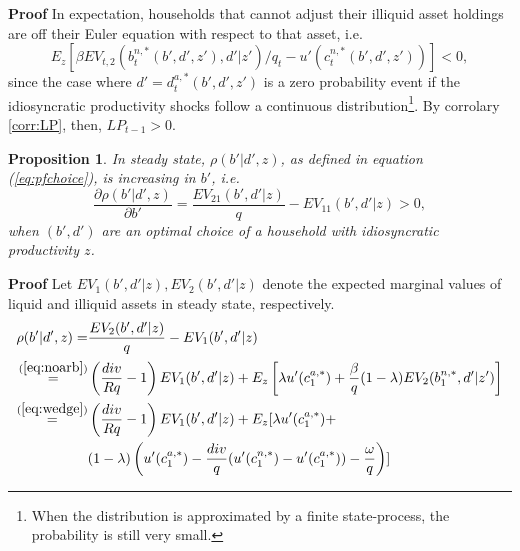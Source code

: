 \documentclass[11pt]{article} %
\newtheorem{prop}{Proposition}
\begin{document}
\textbf{Proof} In expectation, households that cannot adjust their illiquid asset holdings are off their Euler equation with respect to that asset, i.e.
\begin{equation}
E_z \left[ \beta EV_{t,2}(b_t^{n,*}(b',d',z'),d'|z')/q_t - u'(c^{n,*}_t(b',d',z')) \right] <0,
\end{equation}
since the case where $d' = d_t^{a,*}(b',d',z')$ is a zero probability event if the idiosyncratic productivity shocks follow a continuous distribution\footnote{When the distribution is approximated by a finite state-process, the probability is still very small.}. By corrolary \ref{corr:LP}, then, $LP_{t-1}>0$.


\begin{prop}\label{prop:rho}
In steady state, $\rho(b'|d',z)$, as defined in equation (\ref{eq:pfchoice}), is increasing in $b'$, i.e.
\begin{equation}
\frac{\partial \rho(b'|d',z)}{\partial b'} = \frac{EV_{21}(b',d'|z)}{q} - EV_{11}(b',d'|z) > 0,
\end{equation}
when $(b',d')$ are an optimal choice of a household with idiosyncratic productivity $z$.
\end{prop}
\textbf{Proof} Let $EV_1(b',d'|z),EV_2(b',d'|z)$ denote the expected marginal values of liquid and illiquid assets in steady state, respectively.
\begin{align}
\rho(b'|d',z) =& \frac{EV_2(b',d'|z)}{q}-EV_1(b',d'|z) \\ \overset{ (\ref{eq:noarb})}{=}& \left( \frac{div}{Rq} - 1 \right) EV_1(b',d'|z) + E_z\left[ \lambda u'(c_1^{a,*}) + \frac{\beta}{q} (1-\lambda) EV_2(b_1^{n,*},d'|z')\right]\\
\overset{(\ref{eq:wedge})}{=} &  \left( \frac{div}{Rq} - 1 \right) EV_1(b',d'|z) + E_z [ \lambda u'(c_1^{a,*}) +\nonumber \\ & (1-\lambda) \left(u'(c_1^{a,*}) - \frac{div}{q}( u'(c_1^{n,*})-u'(c_1^{a,*}))-\frac{\omega}{q}\right) ]\label{eq:rhostep1}
\end{align}
\end{document}
